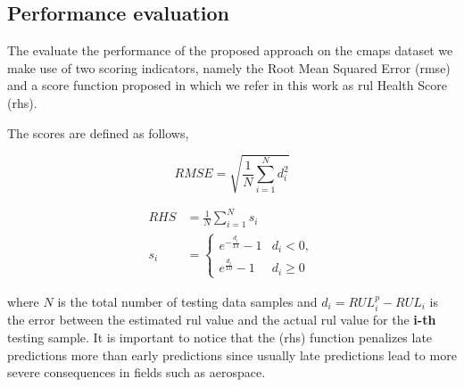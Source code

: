 \subsection{Performance evaluation}
\label{sec:rul_metrics}

The evaluate the performance of the proposed approach on the \gls{cmaps} dataset we make use of two scoring indicators, namely the Root Mean Squared Error (\gls{rmse}) and a score function proposed in \cite{Saxena2008} which we refer in this work as \gls{rul} Health Score (\gls{rhs}). 

\pagebreak

The scores are defined as follows,

\begin{equation}
RMSE = \sqrt{ \frac{1}{N} \sum_{i=1}^{N}{d_i^2}}
\label{eq:rmse}
\end{equation}

\begin{align}
RHS &= \frac{1}{N} \sum_{i=1}^{N}{s_i} \nonumber \\
s_i &= \begin{cases} 
      e^{-\frac{d_i}{13}} - 1 & d_i < 0, \\
      e^{\frac{d_i}{10}} - 1 & d_i \geq 0
\end{cases}
\label{eq:rhs}
\end{align}

where $N$ is the total number of testing data samples and $d_i = RUL_i^p - RUL_i$ is the error between the estimated \gls{rul} value and the actual \gls{rul} value for the \textbf{i-th} testing sample. It is important to notice that the (\gls{rhs}) function penalizes late predictions more than early predictions since usually late predictions lead to more severe consequences in fields such as aerospace.

